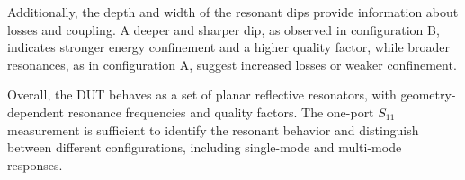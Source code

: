 Additionally, the depth and width of the resonant dips provide information about losses and coupling. A deeper and sharper dip, as observed in configuration B, indicates stronger energy confinement and a higher quality factor, while broader resonances, as in configuration A, suggest increased losses or weaker confinement.

Overall, the DUT behaves as a set of planar reflective resonators, with geometry-dependent resonance frequencies and quality factors. The one-port $S_{11}$ measurement is sufficient to identify the resonant behavior and distinguish between different configurations, including single-mode and multi-mode responses.
